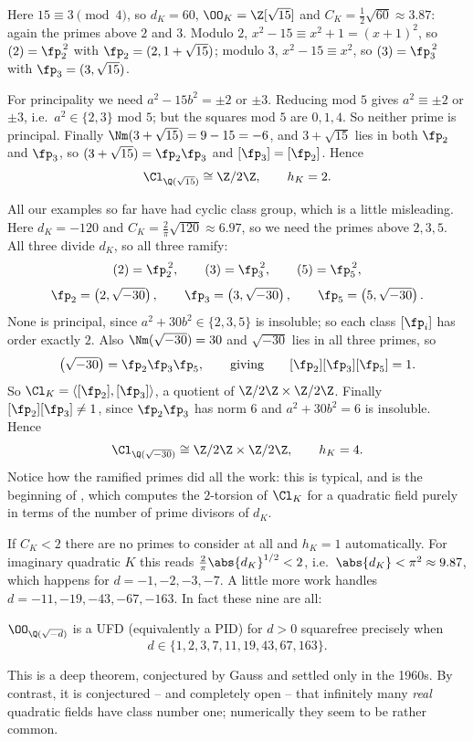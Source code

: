 \begin{example}[$K = \Q(\sqrt{15})$]
	Here $15 \equiv 3\pmod4$, so $d_K = 60$, $\OO_K = \Z[\sqrt{15}]$ and $C_K = \tfrac12\sqrt{60}\approx3.87$: again the primes above $2$ and $3$. Modulo $2$, $x^2-15 \equiv x^2+1 = (x+1)^2$, so $(2) = \fp_2^{\,2}$ with $\fp_2 = (2,1+\sqrt{15})$; modulo $3$, $x^2-15\equiv x^2$, so $(3) = \fp_3^{\,2}$ with $\fp_3 = (3,\sqrt{15})$.

	For principality we need $a^2-15b^2 = \pm2$ or $\pm3$. Reducing mod $5$ gives $a^2 \equiv \pm2$ or $\pm3$, i.e.\ $a^2 \in \{2,3\}$ mod $5$; but the squares mod $5$ are $0,1,4$. So neither prime is principal. Finally $\Nm(3+\sqrt{15}) = 9-15 = -6$, and $3+\sqrt{15}$ lies in both $\fp_2$ and $\fp_3$, so $(3+\sqrt{15}) = \fp_2\fp_3$ and $[\fp_3]=[\fp_2]$. Hence
	$$\Cl_{\Q(\sqrt{15})}\cong\Z/2\Z, \qquad h_K = 2.$$
\end{example}

\begin{example}[A Non-Cyclic Class Group: $K = \Q(\sqrt{-30})$]
	All our examples so far have had cyclic class group, which is a little misleading. Here $d_K = -120$ and $C_K = \tfrac2\pi\sqrt{120}\approx 6.97$, so we need the primes above $2,3,5$. All three divide $d_K$, so all three ramify:
	$$(2) = \fp_2^{\,2},\qquad (3) = \fp_3^{\,2},\qquad (5) = \fp_5^{\,2},$$
	$$\fp_2 = \left(2,\sqrt{-30}\right),\qquad \fp_3 = \left(3,\sqrt{-30}\right),\qquad \fp_5 = \left(5,\sqrt{-30}\right).$$
	None is principal, since $a^2+30b^2 \in \{2,3,5\}$ is insoluble; so each class $[\fp_i]$ has order exactly $2$. Also $\Nm(\sqrt{-30}) = 30$ and $\sqrt{-30}$ lies in all three primes, so
	$$\left(\sqrt{-30}\right) = \fp_2\fp_3\fp_5, \qquad\text{giving}\qquad [\fp_2][\fp_3][\fp_5] = 1.$$
	So $\Cl_K = \langle[\fp_2],[\fp_3]\rangle$, a quotient of $\Z/2\Z\times\Z/2\Z$. Finally $[\fp_2][\fp_3] \neq 1$, since $\fp_2\fp_3$ has norm $6$ and $a^2+30b^2 = 6$ is insoluble. Hence
	$$\Cl_{\Q(\sqrt{-30})} \cong \Z/2\Z\times\Z/2\Z, \qquad h_K = 4.$$
	Notice how the ramified primes did all the work: this is typical, and is the beginning of , which computes the $2$-torsion of $\Cl_K$ for a quadratic field purely in terms of the number of prime divisors of $d_K$.
\end{example}

\begin{example}
	If $C_K < 2$ there are no primes to consider at all and $h_K = 1$ automatically. For imaginary quadratic $K$ this reads $\tfrac2\pi\abs{d_K}^{1/2} < 2$, i.e.\ $\abs{d_K} < \pi^2 \approx 9.87$, which happens for $d = -1,-2,-3,-7$. A little more work handles $d = -11,-19,-43,-67,-163$. In fact these nine are all:
	\begin{theorem}
		$\OO_{\Q(\sqrt{-d})}$ is a UFD (equivalently a PID) for $d > 0$ squarefree precisely when
		$$d \in \{1,2,3,7,11,19,43,67,163\}.$$
	\end{theorem}
	This is a deep theorem, conjectured by Gauss and settled only in the 1960s. By contrast, it is conjectured -- and completely open -- that infinitely many \emph{real} quadratic fields have class number one; numerically they seem to be rather common.
\end{example}


